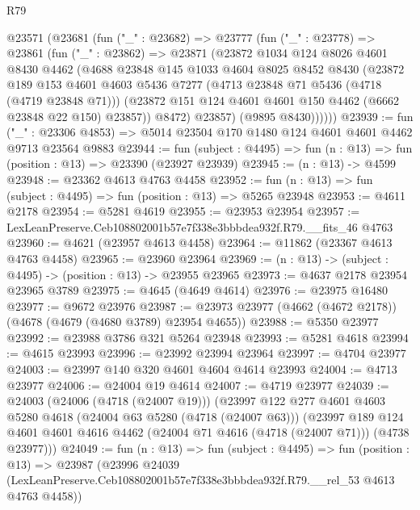 \begin{lexlean}{R79}
\begin{coremodule}
    @23571
      (@23681
        (fun ("_" : @23682) =>
        @23777
          (fun ("_" : @23778) =>
          @23861
            (fun ("_" : @23862) =>
            @23871
              (@23872
                @1034
                @124
                @8026
                @4601
                @8430
                @4462
                (@4688
                  @23848
                  @145
                  @1033
                  @4604
                  @8025
                  @8452
                  @8430
                  (@23872
                    @189
                    @153
                    @4601
                    @4603
                    @5436
                    @7277
                    (@4713 @23848 @71 @5436 (@4718 (@4719 @23848 @71)))
                    (@23872 @151 @124 @4601 @4601 @150 @4462 (@6662 @23848 @22 @150) @23857))
                  @8472)
                @23857)
              (@9895 @8430))))))
@23939 := fun ("_" : @23306 @4853) =>
  @5014 @23504 @170 @1480 @124 @4601 @4601 @4462 @9713 @23564 @9883
@23944 := fun (subject : @4495) => fun (n : @13) => fun (position : @13) => @23390 (@23927 @23939)
@23945 := (n : @13) -> @4599
@23948 := @23362 @4613 @4763 @4458
@23952 := fun (n : @13) => fun (subject : @4495) => fun (position : @13) => @5265 @23948
@23953 := @4611 @2178
@23954 := @5281 @4619
@23955 := @23953 @23954
@23957 := LexLeanPreserve.Ceb108802001b57e7f338e3bbbdea932f.R79.__fits_46 @4763
@23960 := @4621 (@23957 @4613 @4458)
@23964 := @11862 (@23367 @4613 @4763 @4458)
@23965 := @23960 @23964
@23969 := (n : @13) -> (subject : @4495) -> (position : @13) -> @23955 @23965
@23973 := @4637 @2178 @23954 @23965 @3789
@23975 := @4645 (@4649 @4614)
@23976 := @23975 @16480
@23977 := @9672 @23976
@23987 := @23973 @23977 (@4662 (@4672 @2178)) (@4678 (@4679 (@4680 @3789) @23954 @4655))
@23988 := @5350 @23977
@23992 := @23988 @3786 @321 @5264 @23948
@23993 := @5281 @4618
@23994 := @4615 @23993
@23996 := @23992 @23994 @23964
@23997 := @4704 @23977
@24003 := @23997 @140 @320 @4601 @4604 @4614 @23993
@24004 := @4713 @23977
@24006 := @24004 @19 @4614
@24007 := @4719 @23977
@24039 := @24003
    (@24006 (@4718 (@24007 @19)))
    (@23997
      @122
      @277
      @4601
      @4603
      @5280
      @4618
      (@24004 @63 @5280 (@4718 (@24007 @63)))
      (@23997
        @189
        @124
        @4601
        @4601
        @4616
        @4462
        (@24004 @71 @4616 (@4718 (@24007 @71)))
        (@4738 @23977)))
@24049 := fun (n : @13) =>
  fun (subject : @4495) =>
  fun (position : @13) =>
  @23987
    (@23996
      @24039
      (LexLeanPreserve.Ceb108802001b57e7f338e3bbbdea932f.R79.__rel_53 @4613 @4763 @4458))

\end{coremodule}
\end{lexlean}
